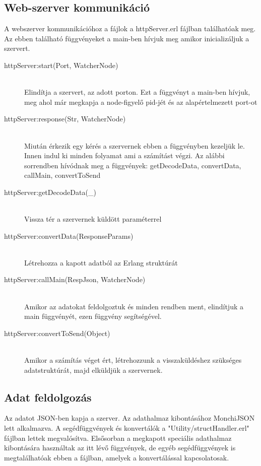 \subsection{Web-szerver kommunikáció}
	A webszerver kommunikációhoz a fájlok a httpServer.erl fájlban találhatóak meg. Az ebben található függvényeket a main-ben hívjuk meg amikor inicializáljuk a szervert.
	\begin{description}
	\item[httpServer:start(Port, WatcherNode)] 
		\hfill \\
		Elindítja a szervert, az adott porton. \newline
		Ezt a függvényt a main-ben hívjuk, meg ahol már megkapja a node-figyelő pid-jét és az alapértelmezett port-ot 
	\item[httpServer:response(Str, WatcherNode)] \hfill \\ 
		Miután érkezik egy kérés a szervernek ebben a függvényben kezeljük le. Innen indul ki minden folyamat ami a számítást végzi. \newline 
		Az alábbi sorrendben hívódnak meg a függvények: \newline
		getDecodeData, convertData, callMain, convertToSend
	\item[httpServer:getDecodeData(\_)] \hfill \\ 
		Vissza tér a szervernek küldött paraméterrel
	\item[httpServer:convertData(ResponseParams)] \hfill \\ 
		Létrehozza a kapott adatból az Erlang struktúrát
	\item[httpServer:callMain(RespJson, WatcherNode)] \hfill \\ 
		Amikor az adatokat feldolgoztuk és minden rendben ment, elindítjuk a main függvényét, ezen függvény segítségével.
	\item[httpServer:convertToSend(Object)] \hfill \\ 
		Amikor a számítás véget ért, létrehozzunk a visszaküldéshez szükséges adatstruktúrát, majd elküldjük a szervernek.
	\end{description}
\subsection{Adat feldolgozás}
	Az adatot JSON-ben kapja a szerver. Az adathalmaz kibontásához MonchiJSON lett alkalmazva. 
	A segédfüggvények és konvertálók a "Utility/structHandler.erl" fájlban lettek megvalósítva.\newline
	Elsősorban a megkapott speciális adathalmaz kibontására használtak az itt lévő függvények, de egyéb segédfüggvények is megtalálhatóak ebben a fájlban, amelyek a konvertálással kapcsolatosak.

